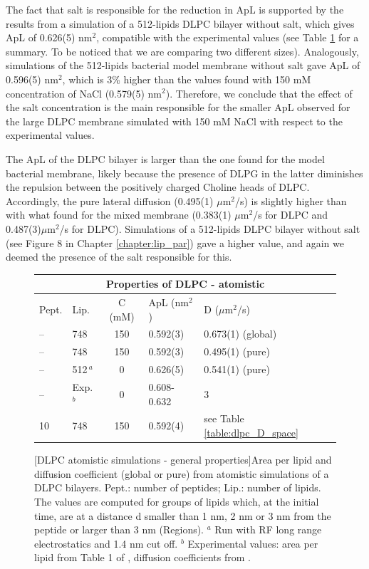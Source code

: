 The fact that salt is responsible for the reduction in ApL is supported by the results from a simulation of a 512-lipids DLPC bilayer without salt, which gives ApL of 0.626(5) nm$^2$, compatible with the experimental values (see Table \ref{table:dlpc_apl} for a summary. To be noticed that we are comparing two different sizes). Analogously, simulations of the 512-lipids bacterial model membrane without salt gave ApL of 0.596(5) nm$^2$, which is 3\% higher than the values found with 150 mM concentration of NaCl (0.579(5) nm$^2$).
%
Therefore, we conclude that the effect of the salt concentration is the main responsible for the smaller ApL observed for the large DLPC membrane simulated with 150 mM NaCl with respect to the experimental values.

The ApL of the DLPC bilayer is larger than the one found for the model bacterial membrane, likely because the presence of DLPG in the latter diminishes the repulsion between the positively charged Choline heads of DLPC. Accordingly, the pure lateral diffusion (0.495(1) $\mu$m$^2$/s) is slightly higher than with what found for the mixed membrane (0.383(1) $\mu$m$^2$/s for DLPC and 0.487(3)$\mu$m$^2$/s for DLPC). Simulations of a 512-lipids DLPC bilayer without salt (see Figure 8 in Chapter \ref{chapter:lip_par}) gave a higher value, and again we deemed the presence of the salt responsible for this.

\begin{figure}[t!]
\centering
 \def\arraystretch{1.6}
\begin{tabular}{llcll}
\multicolumn{5}{c}{\textbf{Properties of DLPC - atomistic}} \\
\hline
Pept. & Lip. & C (mM) & ApL (nm$^2$) & D ($\mu$m$^2$/s) \\
\hline
-- & 748 & 150 & 0.592(3) & 0.673(1) (global) \\
-- & 748 & 150 & 0.592(3) & 0.495(1) (pure) \\
-- & 512$\,^a$ & 0 & 0.626(5) & 0.541(1) (pure) \\
\cline{2-5}
-- & Exp.$^b$ & 0 & 0.608-0.632 & 3 \\
\hline
10 & 748 & 150 & 0.592(4) & see Table \ref{table:dlpc_D_space} \\
\hline
 \end{tabular}
[DLPC atomistic simulations - general properties]{Area per lipid and diffusion coefficient (global or pure) from atomistic simulations of a DLPC bilayers. Pept.: number of peptides; Lip.: number of lipids. The values are computed for groups
of lipids which, at the initial time, are at a distance d smaller than 1 nm, 2 nm or
3 nm from the peptide or larger than 3 nm (Regions). $^a$ Run with RF long range electrostatics and 1.4 nm cut off. $^b$ Experimental values: area per lipid from Table 1 of \citet{Poger2016}, diffusion coefficients from \citet{Lindblom2009}.}
\label{table:dlpc_apl}
\end{figure}


